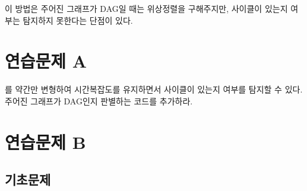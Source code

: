 이 방법은 주어진 그래프가 DAG일 때는 위상정렬을 구해주지만, 사이클이 있는지 여부는 탐지하지 못한다는 단점이 있다.

\section{연습문제 A}
\begin{problem}
    를 약간만 변형하여 시간복잡도를 유지하면서 사이클이 있는지 여부를 탐지할 수 있다. 주어진 그래프가 DAG인지 판별하는 코드를 추가하라.
\end{problem}

\section{연습문제 B}

\subsection{기초문제}

